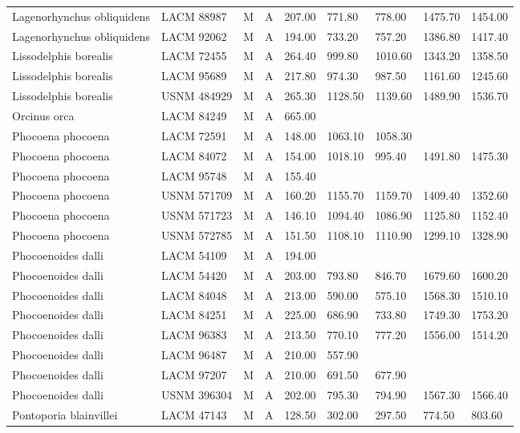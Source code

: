 \begin{longtable}{|p{1in}p{.8in}p{.25in}p{.25in}p{.5in}p{.5in}p{.5in}p{.5in}p{.55in}|}
  Lagenorhynchus obliquidens & LACM 88987 & M & A & 207.00 & 771.80 & 778.00 & 1475.70 & 1454.00 \\ 
  Lagenorhynchus obliquidens & LACM 92062 & M & A & 194.00 & 733.20 & 757.20 & 1386.80 & 1417.40 \\ 
  Lissodelphis borealis & LACM 72455 & M & A & 264.40 & 999.80 & 1010.60 & 1343.20 & 1358.50 \\ 
  Lissodelphis borealis & LACM 95689 & M & A & 217.80 & 974.30 & 987.50 & 1161.60 & 1245.60 \\ 
  Lissodelphis borealis & USNM 484929 & M & A & 265.30 & 1128.50 & 1139.60 & 1489.90 & 1536.70 \\ 
  Orcinus orca & LACM 84249 & M & A & 665.00 &  &  &  &  \\ 
  Phocoena phocoena & LACM 72591 & M & A & 148.00 & 1063.10 & 1058.30 &  &  \\ 
  Phocoena phocoena & LACM 84072 & M & A & 154.00 & 1018.10 & 995.40 & 1491.80 & 1475.30 \\ 
  Phocoena phocoena & LACM 95748 & M & A & 155.40 &  &  &  &  \\ 
  Phocoena phocoena & USNM 571709 & M & A & 160.20 & 1155.70 & 1159.70 & 1409.40 & 1352.60 \\ 
  Phocoena phocoena & USNM 571723 & M & A & 146.10 & 1094.40 & 1086.90 & 1125.80 & 1152.40 \\ 
  Phocoena phocoena & USNM 572785 & M & A & 151.50 & 1108.10 & 1110.90 & 1299.10 & 1328.90 \\ 
  Phocoenoides dalli & LACM 54109 & M & A & 194.00 &  &  &  &  \\ 
  Phocoenoides dalli & LACM 54420 & M & A & 203.00 & 793.80 & 846.70 & 1679.60 & 1600.20 \\ 
  Phocoenoides dalli & LACM 84048 & M & A & 213.00 & 590.00 & 575.10 & 1568.30 & 1510.10 \\ 
  Phocoenoides dalli & LACM 84251 & M & A & 225.00 & 686.90 & 733.80 & 1749.30 & 1753.20 \\ 
  Phocoenoides dalli & LACM 96383 & M & A & 213.50 & 770.10 & 777.20 & 1556.00 & 1514.20 \\ 
  Phocoenoides dalli & LACM 96487 & M & A & 210.00 & 557.90 &  &  &  \\ 
  Phocoenoides dalli & LACM 97207 & M & A & 210.00 & 691.50 & 677.90 &  &  \\ 
  Phocoenoides dalli & USNM 396304 & M & A & 202.00 & 795.30 & 794.90 & 1567.30 & 1566.40 \\ 
  Pontoporia blainvillei & LACM 47143 & M & A & 128.50 & 302.00 & 297.50 & 774.50 & 803.60 \\ 

\end{longtable}
